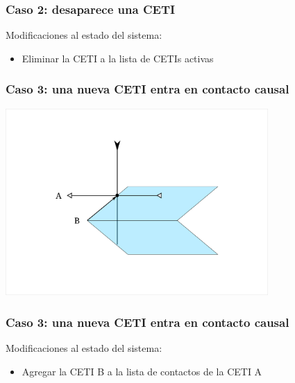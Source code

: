 \documentclass[handout]{beamer}
\theoremstyle{plain}
\theoremstyle{definition}
\theoremstyle{remark}
\begin{document}
\begin{frame}\frametitle{Caso 2: desaparece una CETI}

   Modificaciones al estado del sistema:
   \begin{itemize}
      \item Eliminar la CETI a la lista de CETIs activas
   \end{itemize}

\end{frame}  %

%
%
%
%

\begin{frame}\frametitle{Caso 3: una nueva CETI entra en contacto causal}
   \centering
   \includegraphics[width=0.75\textwidth]{C4.png}
\end{frame}  %

\begin{frame}\frametitle{Caso 3: una nueva CETI entra en contacto causal}

   Modificaciones al estado del sistema:
   \begin{itemize}
      \item  Agregar la CETI B a la lista de contactos de la CETI A
   \end{itemize}

\end{frame}  %
\end{document}
